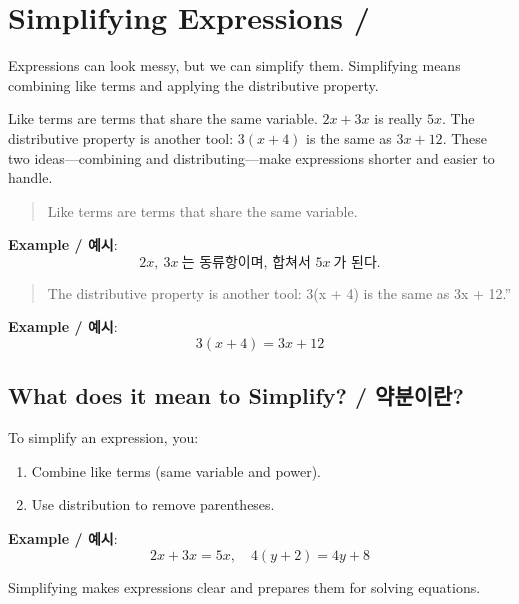 \newpage
\section{Simplifying Expressions / }

Expressions can look messy, but we can simplify them. Simplifying means combining 
like terms and applying the distributive property.

Like terms are terms that share the same variable. \(2x + 3x\) is really \(5x\). The distributive property is another tool: \(3(x + 4)\) is the same as \(3x + 12\). These two ideas—combining and distributing—make expressions shorter and easier to handle.  


\blockquote{Like terms are terms that share the same variable.}

\textbf{Example / 예시}:  
\[
2x, \ 3x \ \text{는 동류항이며, 합쳐서 } 5x \ \text{가 된다.}
\]

\blockquote{The distributive property is another tool: 3(x + 4) is the same as 3x + 12.”}

\textbf{Example / 예시}:  
\[
3(x + 4) = 3x + 12
\]

\subsection{What does it mean to Simplify? / 약분이란?}
To simplify an expression, you:
\begin{enumerate}
\item Combine like terms (same variable and power).  
\item Use distribution to remove parentheses. 
\end{enumerate}

\textbf{Example / 예시}:  
\[
2x + 3x = 5x, \quad 4(y+2) = 4y+8
\]

Simplifying makes expressions clear and prepares them for solving equations.


































